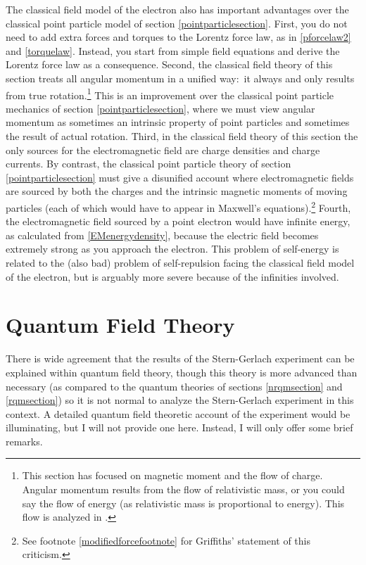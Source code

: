 \documentclass[12pt,secnumarabic,amsmath,amssymb,balancelastpage,nofootinbib]{article}
\begin{document}
The classical field model of the electron also has important advantages over the classical point particle model of section \ref{pointparticlesection}.  First, you do not need to add extra forces and torques to the Lorentz force law, as in \eqref{pforcelaw2} and \eqref{torquelaw}.  Instead, you start from simple field equations and derive the Lorentz force law as a consequence.  Second, the classical field theory of this section treats all angular momentum in a unified way:\ it always and only results from true rotation.\footnote{This section has focused on magnetic moment and the flow of charge.  Angular momentum results from the flow of relativistic mass, or you could say the flow of energy (as relativistic mass is proportional to energy).  This flow is analyzed in \citet{ohanian, howelectronsspin}.}  This is an improvement over the classical point particle mechanics of section \ref{pointparticlesection}, where we must view angular momentum as sometimes an intrinsic property of point particles and sometimes the result of actual rotation.  Third, in the classical field theory of this section the only sources for the electromagnetic field are charge densities and charge currents.  By contrast, the classical point particle theory of section \ref{pointparticlesection} must give a disunified account where electromagnetic fields are sourced by both the charges and the intrinsic magnetic moments of moving particles (each of which would have to appear in Maxwell's equations).\footnote{See footnote \ref{modifiedforcefootnote} for Griffiths' statement of this criticism.}  Fourth, the electromagnetic field sourced by a point electron would have infinite energy, as calculated from \eqref{EMenergydensity}, because the electric field becomes extremely strong as you approach the electron.  This problem of self-energy is related to the (also bad) problem of self-repulsion facing the classical field model of the electron, but is arguably more severe because of the infinities involved.








\section{Quantum Field Theory}\label{qftsection}

There is wide agreement that the results of the Stern-Gerlach experiment can be explained within quantum field theory, though this theory is more advanced than necessary (as compared to the quantum theories of sections \ref{nrqmsection} and \ref{rqmsection}) so it is not normal to analyze the Stern-Gerlach experiment in this context.  A detailed quantum field theoretic account of the experiment would be illuminating, but I will not provide one here.  Instead, I will only offer some brief remarks.
\end{document}
